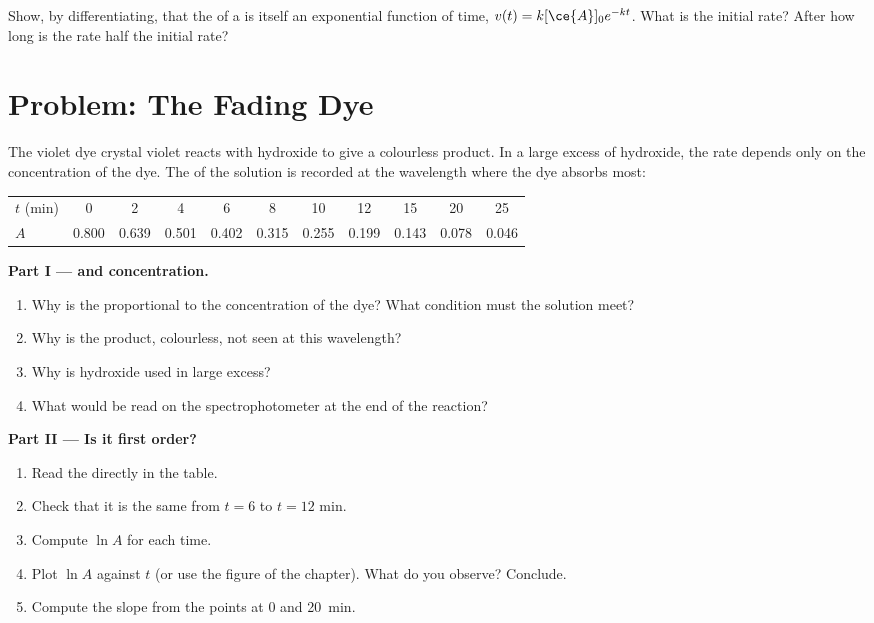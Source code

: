 \begin{exercise}[$\star\star\star$]\label{exo:g12:reaction-rates:15}
Show, by differentiating, that the  of a
 is itself an exponential function of time,
$v(t) = k[\ce{A}]_0 e^{-kt}$. What is the initial rate? After how long is
the rate half the initial rate?
\end{exercise}

\section{Problem: The Fading Dye}

\begin{problem}
\label{pb:g12:reaction-rates:1}
The violet dye crystal violet reacts with hydroxide  to give a
colourless product. In a large excess of hydroxide, the rate depends
only on the concentration of the dye. The  of the solution is
recorded at the wavelength where the dye absorbs most:
\begin{center}
\small
\begin{tabular}{l*{10}{c}}
\hline
$t$ (\si{min}) & 0 & 2 & 4 & 6 & 8 & 10 & 12 & 15 & 20 & 25 \\
$A$ & 0.800 & 0.639 & 0.501 & 0.402 & 0.315 & 0.255 & 0.199 & 0.143 &
0.078 & 0.046 \\
\hline
\end{tabular}
\end{center}

\medskip
\noindent\textbf{Part I ---  and concentration.}
\begin{enumerate}
  \item Why is the  proportional to the concentration of the
        dye? What condition must the solution meet?
  \item Why is the product, colourless, not seen at this wavelength?
  \item Why is hydroxide used in large excess?
  \item What would be read on the spectrophotometer at the end of the
        reaction?
\end{enumerate}

\medskip
\noindent\textbf{Part II --- Is it first order?}
\begin{enumerate}[resume]
  \item Read the  directly in the table.
  \item Check that it is the same from $t = 6$ to $t = 12$ min.
  \item Compute $\ln A$ for each time.
  \item Plot $\ln A$ against $t$ (or use the figure of the chapter). What
        do you observe? Conclude.
  \item Compute the slope from the points at 0 and \qty{20}{min}.
\end{enumerate}


\end{problem}
